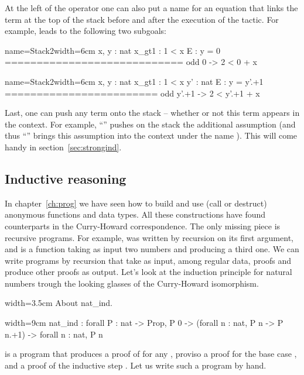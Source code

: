 At the left of the \C{:} operator one can also put a name for an
equation that links the term at the top of the stack before and
after the execution of the tactic. For example,
  leads to
the following two subgoals:

\begin{coqout}{name=Stack2}{width=6cm}
 x, y : nat
 x_gt1 : 1 < x
 E : y = 0
============================
 odd 0 -> 2 < 0 + x
\end{coqout}
\begin{coqout}{name=Stack2}{width=6cm}
 x, y : nat
 x_gt1 : 1 < x
 y' : nat
 E : y = y'.+1
========================
 odd y'.+1 -> 2 < y'.+1 + x
\end{coqout}

Last, one can push any term onto the stack -- whether or not this
term appears in the context. For example,
``'' pushes on the stack
the additional assumption  (and thus
``'' brings this assumption into the context
under the name ). This
will come handy in section~\ref{sec:strongind}.

\subsection{Inductive reasoning}\label{ssec:indreason}

In chapter~\ref{ch:prog} we have seen how to build and use (call or destruct)
anonymous functions and data types.  All these
constructions have found counterparts in the Curry-Howard correspondence.
The only missing piece is recursive programs.  For example,
 was written by recursion on its first argument, and is a
function taking as input two numbers and producing a third one.
We can write programs by recursion that take as input, among regular  data,
proofs and produce  other proofs as output.  Let's look at the
induction principle for natural numbers trough the looking glasses of the
Curry-Howard isomorphism.

\begin{coq}{}{width=3.5cm}
About nat_ind.
\end{coq}
\begin{coqout}{}{width=9cm}
nat_ind : forall P : nat -> Prop,
  P 0 -> (forall n : nat, P n -> P n.+1) -> forall n : nat, P n
\end{coqout}
 is a program that produces a proof of  for any ,
proviso a proof for the base case , and a proof
of the inductive step .
Let us write such a program by hand.

